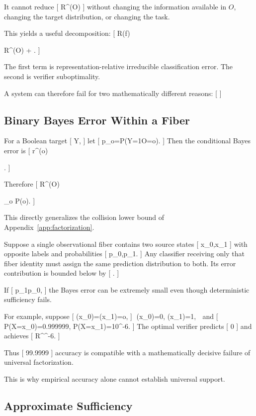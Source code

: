 \documentclass[11pt]{article}
\begin{document}
It cannot reduce
[
R^\star(O)
]
without changing the information available in $O$, changing the target distribution, or changing the task.

This yields a useful decomposition:
[
R(f)

R^\star(O)
+
.
]

The first term is representation-relative irreducible classification error. The second is verifier suboptimality.

A system can therefore fail for two mathematically different reasons:
[
]

\subsection{Binary Bayes Error Within a Fiber}

For a Boolean target
[
Y,
]
let
[
p_o=P(Y=1\mid O=o).
]
Then the conditional Bayes error is
[
r^\star(o)

.
]

Therefore
[
R^\star(O)

\sum_o
P(o).
]

This directly generalizes the collision lower bound of Appendix~\ref{app:factorization}.

Suppose a single observational fiber contains two source states
[
x_0,x_1
]
with opposite labels and probabilities
[
p_0,p_1.
]
Any classifier receiving only that fiber identity must assign the same prediction distribution to both. Its error contribution is bounded below by
[
.
]

If
[
p_1\ll p_0,
]
the Bayes error can be extremely small even though deterministic sufficiency fails.

For example, suppose
[
\pi(x_0)=\pi(x_1)=o,
]
\Phi(x_0)=0,
\qquad
\Phi(x_1)=1,

and
[
P(X=x_0)=0.999999,
\qquad
P(X=x_1)=10^{-6}.
]
The optimal verifier predicts
[
0
]
and achieves
[
R^^{-6}.
]

Thus
[
99.9999%
]
accuracy is compatible with a mathematically decisive failure of universal factorization.

This is why empirical accuracy alone cannot establish universal support.

\subsection{Approximate Sufficiency}
\end{document}
